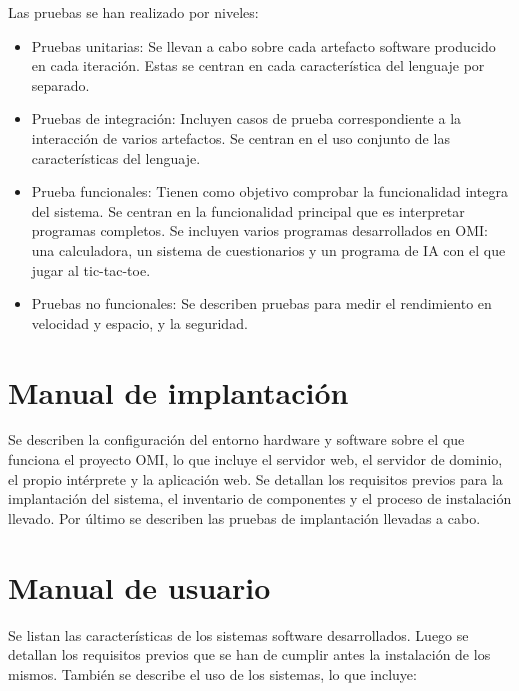 Las pruebas se han realizado por niveles:

\begin{itemize}
\item Pruebas unitarias: Se llevan a cabo sobre cada artefacto software producido en cada iteración. Estas se centran en cada característica del lenguaje por separado.
\item Pruebas de integración: Incluyen casos de prueba correspondiente a la interacción de varios artefactos. Se centran en el uso conjunto de las características del lenguaje.
\item Prueba funcionales: Tienen como objetivo comprobar la funcionalidad integra del sistema. Se centran en la funcionalidad principal que es interpretar programas completos.  Se incluyen varios 
programas desarrollados en OMI: una calculadora, un sistema de cuestionarios y un programa de IA con el que jugar al tic-tac-toe.
\item Pruebas no funcionales: Se describen pruebas para medir el rendimiento en velocidad y espacio, y la seguridad.
\end{itemize}

\section{Manual de implantación}
Se describen la configuración del entorno hardware y software sobre el que funciona el proyecto OMI, lo que incluye el servidor web, el servidor de dominio, el propio intérprete y la aplicación web. Se detallan 
los requisitos previos para la implantación del sistema, el inventario de componentes y el proceso de instalación llevado. Por último se describen las pruebas de implantación llevadas a cabo.

\section{Manual de usuario}
Se listan las características de los sistemas software desarrollados. Luego se detallan los requisitos previos que se han de cumplir antes la instalación de los mismos. También se describe el uso de los sistemas, lo que incluye:

